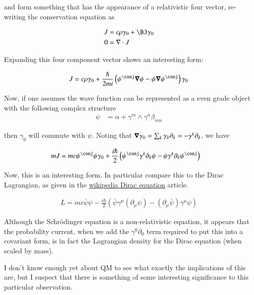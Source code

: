 \documentclass{article}
\begin{document}
and form something that has the appearance of a relativistic four vector, re-writing the conservation equation as

\begin{align*}
J &= c\rho \gamma_0 + \BJ \gamma_0 \\
0 &= \grad \cdot J
\end{align*}

Expanding this four component vector shows an interesting form:

\begin{align*}
J &= c \rho \gamma_0 + 
\frac{\hbar}{2mi} \left( \psi^\conj \spacegrad \psi - \psi \spacegrad \psi^\conj \right) \gamma_0 \\
\end{align*}

Now, if one assumes the wave function can be represented as a even grade object with the following complex
structure
\begin{align*}
\psi &= \alpha + \gamma^m \wedge \gamma^n \beta_{mn}
\end{align*}

then $\gamma_0$ will commute with $\psi$.  Noting that $\boldsymbol{\nabla} \gamma_0 = \sum_k \gamma_k \partial_k = -\gamma^k \partial_k$, we have

\begin{align*}
m J &= m c \psi^\conj \psi \gamma_0 + 
\frac{i\hbar}{2} \left( \psi^\conj \gamma^k \partial_k \psi - \psi \gamma^k \partial_k \psi^\conj \right) 
\end{align*}

Now, this is an interesting form.  In particular compare this to the Dirac Lagrangian, as given in 
the \href{http://en.wikipedia.org/wiki/Dirac_equation#Adjoint_equation_and_Dirac_current}{wikipedia Dirac equation} article.

\begin{align*}
L = mc \bar{\psi}\psi - \frac{i\hbar}{2}(\bar{\psi}\gamma^\mu (\partial_\mu\psi) - (\partial_\mu\bar{\psi})\gamma^\mu \psi)
\end{align*}

Although the Schr\"{o}dinger equation is a non-relativistic equation, it appears that the probability current, 
when we add the $\gamma^0 \partial_0$ term required to put this into a covariant form, is in fact the Lagrangian density
for the Dirac equation (when scaled by mass).

I don't know enough yet about QM to see what exactly the implications of this are, but I suspect that there is something
of some interesting significance to this particular observation.
\end{document}
